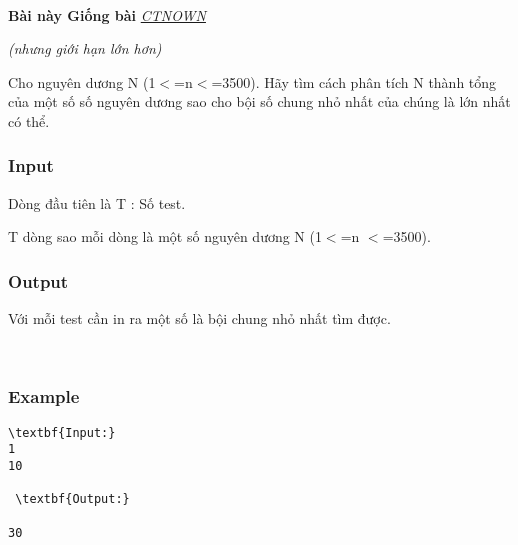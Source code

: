 

 

\textbf{Bài này Giống bài }\href{http://vnoi.info/problems/show/CTNOWN/}{\emph{ CTNOWN}}

\emph{(nhưng giới hạn lớn hơn) }

Cho nguyên dương N (1$<$=n$<$=3500). Hãy tìm cách phân tích N thành tổng của một số số nguyên dương sao cho bội số chung nhỏ nhất của chúng là lớn nhất có thể.

\subsubsection{Input}

Dòng đầu tiên là T : Số test.

T dòng sao mỗi dòng là một số nguyên dương N (1$<$=n $<$=3500).

\subsubsection{Output}

Với mỗi test cần in ra một số là bội chung nhỏ nhất tìm được.

 

\subsubsection{Example}
\begin{verbatim}
\textbf{Input:}
1
10

 \textbf{Output:}

30
\end{verbatim}